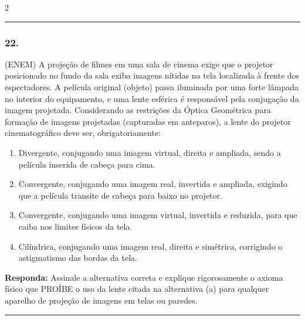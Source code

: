 \documentclass[twoside, 10pt, a4paper]{article}
\newlength{\espacoPreQuestao}\setlength{\espacoPreQuestao}{0.1cm}
\newlength{\espacoQuestao}\setlength{\espacoQuestao}{0.2cm}
\newlength{\espacoAlt}\setlength{\espacoAlt}{0.2cm}
\begin{document}
\begin{multicols*}{2}
\noindent\textcolor{CorLinha}{\rule{\linewidth}{0.5pt}} 
\par\vspace{\espacoPreQuestao}
\subsubsection*{22.} (ENEM) A projeção de filmes em uma sala de cinema exige que o projetor posicionado no fundo da sala exiba imagens nítidas na tela localizada à frente dos espectadores. A película original (objeto) passa iluminada por uma forte lâmpada no interior do equipamento, e uma lente esférica é responsável pela conjugação da imagem projetada.
Considerando as restrições da Óptica Geométrica para formação de imagens projetadas (capturadas em anteparos), a lente do projetor cinematográfico deve ser, obrigatoriamente:
\begin{enumerate}[label=\alph*), itemsep=\espacoAlt]
\item Divergente, conjugando uma imagem virtual, direita e ampliada, sendo a película inserida de cabeça para cima.
\item Convergente, conjugando uma imagem real, invertida e ampliada, exigindo que a película transite de cabeça para baixo no projetor.
\item Convergente, conjugando uma imagem virtual, invertida e reduzida, para que caiba nos limites físicos da tela.
\item Cilíndrica, conjugando uma imagem real, direita e simétrica, corrigindo o astigmatismo das bordas da tela.
\end{enumerate}
\begin{boxresponda}
\textbf{Responda:} Assinale a alternativa correta e explique rigorosamente o axioma físico que PROÍBE o uso da lente citada na alternativa (a) para qualquer aparelho de projeção de imagens em telas ou paredes.
\end{boxresponda}
\par\vspace{\espacoQuestao}

\noindent\textcolor{CorLinha}{\rule{\linewidth}{0.5pt}} 
\par\vspace{\espacoPreQuestao}

\end{multicols*}
\end{document}
